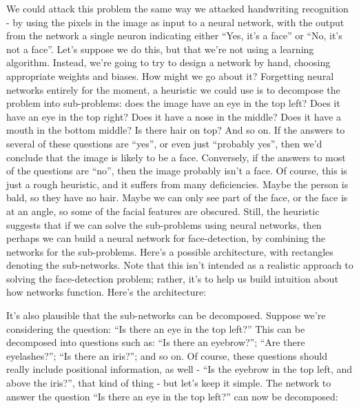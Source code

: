 We could attack this problem the same way we attacked handwriting recognition - by using the pixels in the image as input to a neural network, with the output from the network a single neuron indicating either ``Yes, it's a face'' or ``No, it's not a face''.
Let's suppose we do this, but that we're not using a learning algorithm. Instead, we're going to try to design a network by hand, choosing appropriate weights and biases. How might we go about it? Forgetting neural networks entirely for the moment, a heuristic we could use is to decompose the problem into sub-problems: does the image have an eye in the top left? Does it have an eye in the top right? Does it have a nose in the middle? Does it have a mouth in the bottom middle? Is there hair on top? And so on.
If the answers to several of these questions are ``yes'', or even just ``probably yes'', then we'd conclude that the image is likely to be a face. Conversely, if the answers to most of the questions are ``no'', then the image probably isn't a face.
Of course, this is just a rough heuristic, and it suffers from many deficiencies. Maybe the person is bald, so they have no hair. Maybe we can only see part of the face, or the face is at an angle, so some of the facial features are obscured. Still, the heuristic suggests that if we can solve the sub-problems using neural networks, then perhaps we can build a neural network for face-detection, by combining the networks for the sub-problems. Here's a possible architecture, with rectangles denoting the sub-networks. Note that this isn't intended as a realistic approach to solving the face-detection problem; rather, it's to help us build intuition about how networks function. Here's the architecture:

It's also plausible that the sub-networks can be decomposed. Suppose we're considering the question: ``Is there an eye in the top left?'' This can be decomposed into questions such as: ``Is there an eyebrow?''; ``Are there eyelashes?''; ``Is there an iris?''; and so on. Of course, these questions should really include positional information, as well - ``Is the eyebrow in the top left, and above the iris?'', that kind of thing - but let's keep it simple. The network to answer the question ``Is there an eye in the top left?'' can now be decomposed:

